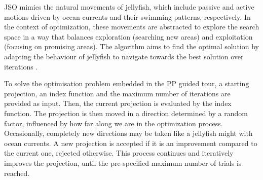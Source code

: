 \documentclass[
  number,
  preprint,
  3p]{elsarticle}
\begin{document}
JSO mimics the natural movements of jellyfish, which include passive and
active motions driven by ocean currents and their swimming patterns,
respectively. In the context of optimization, these movements are
abstracted to explore the search space in a way that balances
exploration (searching new areas) and exploitation (focusing on
promising areas). The algorithm aims to find the optimal solution by
adapting the behaviour of jellyfish to navigate towards the best
solution over iterations \citep{chou_novel_2021}.

To solve the optimisation problem embedded in the PP guided tour, a
starting projection, an index function and the maximum number of
iterations are provided as input. Then, the current projection is
evaluated by the index function. The projection is then moved in a
direction determined by a random factor, influenced by how far along we
are in the optimization process. Occasionally, completely new directions
may be taken like a jellyfish might with ocean currents. A new
projection is accepted if it is an improvement compared to the current
one, rejected otherwise. This process continues and iteratively improves
the projection, until the pre-specified maximum number of trials is
reached.
\end{document}

